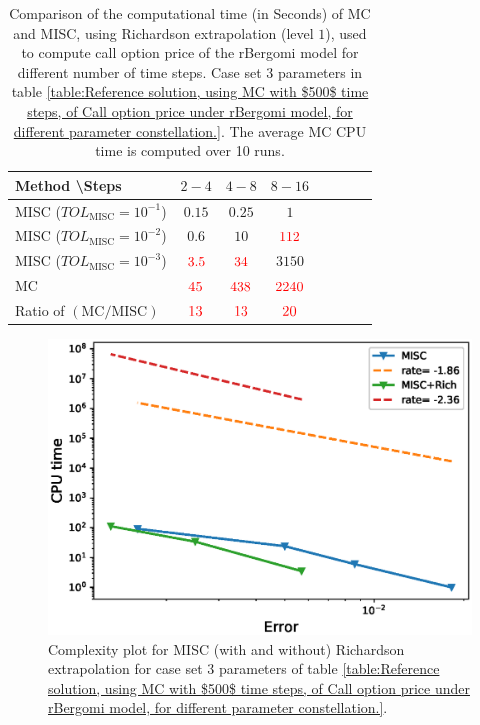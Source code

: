 \begin{table}[h!]
	\centering
	\begin{tabular}{l*{6}{c}r}
		Method \textbackslash  Steps            & $2-4$ & $4-8$ & $8-16$ &   \\
		\hline
		MISC ($TOL_{\text{MISC}}=10^{-1}$)   & $0.15$ & $0.25$ & $1$  \\
		MISC ($TOL_{\text{MISC}}=10^{-2}$)   & $0.6$ & $10$ & ${\color{red}112}$  \\
		MISC ($TOL_{\text{MISC}}=10^{-3}$)  & ${\color{red}3.5}$ & ${\color{red}34}$ & $3150$ \\
		\hline	
			MC  & ${\color{red}45}$  & ${\color{red}438}$  & ${\color{red}2240}$ \\
			
			\hline
				Ratio of $\left(\text{MC}/ \text{MISC} \right)$   & ${\color{red}13}$  & ${\color{red}13}$  & ${\color{red}20}$ \\

		\hline
	\end{tabular}
	\caption{Comparison of the computational time (in Seconds) of  MC and MISC, using Richardson extrapolation (level $1$), used to compute call option price of the rBergomi model for different number of time steps. Case set $3$ parameters in table \ref{table:Reference solution, using MC with $500$ time steps, of Call option price under rBergomi model, for different parameter constellation.}. The
average MC CPU time is computed over 10 runs.}
	\label{Comparsion of the computational time of  MC and MISC, using Richardson extrapolation (level $1$), used to compute Call option price of rBergomi model for different number of time steps. Case set $3$ parameters}
\end{table}

\FloatBarrier


	\begin{figure}[h!]
	\centering
	\includegraphics[width=0.4\linewidth]{./figures/rBergomi_Complexity_rates/set5/error_vs_time_set5_comparison}
	
	\caption{Complexity plot for  MISC (with and without) Richardson extrapolation for case set $3$ parameters of table \ref{table:Reference solution, using MC with $500$ time steps, of Call option price under rBergomi model, for different parameter constellation.}.}
	\label{fig:Complexity plot for  MISC for case set $3$ parameters, comparison}
\end{figure}


